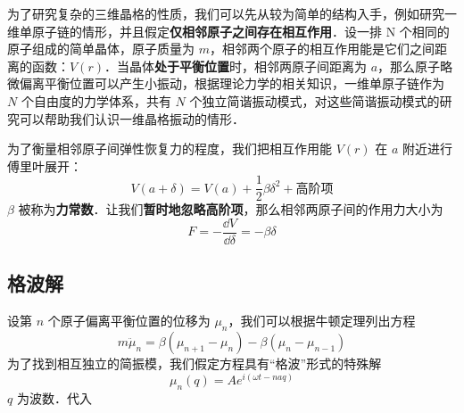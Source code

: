 
为了研究复杂的三维晶格的性质，我们可以先从较为简单的结构入手，例如研究一维单原子链的情形，并且假定\textbf{仅相邻原子之间存在相互作用}．设一排 N 个相同的原子组成的简单晶体，原子质量为 $m$，相邻两个原子的相互作用能是它们之间距离的函数：$V(r)$．当晶体\textbf{处于平衡位置}时，相邻两原子间距离为 $a$，那么原子略微偏离平衡位置可以产生小振动，根据理论力学的相关知识，一维单原子链作为 $N$ 个自由度的力学体系，共有 $N$ 个独立简谐振动模式，对这些简谐振动模式的研究可以帮助我们认识一维晶格振动的情形．

为了衡量相邻原子间弹性恢复力的程度，我们把相互作用能 $V(r)$ 在 $a$ 附近进行傅里叶展开：
\begin{equation}
V(a+\delta)=V(a)+\frac{1}{2}\beta \delta^2+\text{高阶项}
\end{equation}
$\beta$ 被称为\textbf{力常数}．让我们\textbf{暂时地忽略高阶项}，那么相邻两原子间的作用力大小为
\begin{equation}
F=-\frac{\dd V}{\dd \delta}=-\beta\delta
\end{equation}

\subsection{格波解}
设第 $n$ 个原子偏离平衡位置的位移为 $\mu_n$，我们可以根据牛顿定理列出方程
\begin{equation}\label{onatom_eq1}
m \ddot \mu_n = \beta(\mu_{n+1}-\mu_n)-\beta(\mu_n - \mu_{n-1})
\end{equation}
为了找到相互独立的简振模，我们假定方程具有“格波”形式的特殊解
\begin{equation}
\mu_{n}(q)=Ae^{i(\omega t-naq)}
\end{equation}
$q$ 为波数．代入